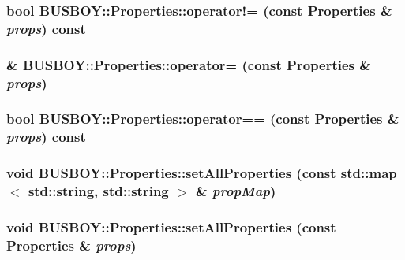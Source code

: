 \hypertarget{classBUSBOY_1_1Properties_a6c35922ee8218fcff503aef635ffe5b6}{
\subsubsection[{operator!=}]{\setlength{\rightskip}{0pt plus 5cm}bool BUSBOY::Properties::operator!= (const {\bf Properties} \& {\em props}) const}}
\label{classBUSBOY_1_1Properties_a6c35922ee8218fcff503aef635ffe5b6}
\hypertarget{classBUSBOY_1_1Properties_ada376798f2cd01b580e41e8958a7a725}{
\subsubsection[{operator=}]{ \& BUSBOY::Properties::operator= (const {\bf Properties} \& {\em props})}}
\label{classBUSBOY_1_1Properties_ada376798f2cd01b580e41e8958a7a725}
\hypertarget{classBUSBOY_1_1Properties_a204c8eeb5b11ea86f4e0a9e6547acc18}{
\subsubsection[{operator==}]{\setlength{\rightskip}{0pt plus 5cm}bool BUSBOY::Properties::operator== (const {\bf Properties} \& {\em props}) const}}
\label{classBUSBOY_1_1Properties_a204c8eeb5b11ea86f4e0a9e6547acc18}
\hypertarget{classBUSBOY_1_1Properties_a5648c05d0e377b42f087b899e64e5aff}{
\subsubsection[{setAllProperties}]{\setlength{\rightskip}{0pt plus 5cm}void BUSBOY::Properties::setAllProperties (const std::map$<$ std::string, std::string $>$ \& {\em propMap})}}
\label{classBUSBOY_1_1Properties_a5648c05d0e377b42f087b899e64e5aff}
\hypertarget{classBUSBOY_1_1Properties_a073d551f053cd93ab5087cfa41e07b84}{
\subsubsection[{setAllProperties}]{\setlength{\rightskip}{0pt plus 5cm}void BUSBOY::Properties::setAllProperties (const {\bf Properties} \& {\em props})}}
